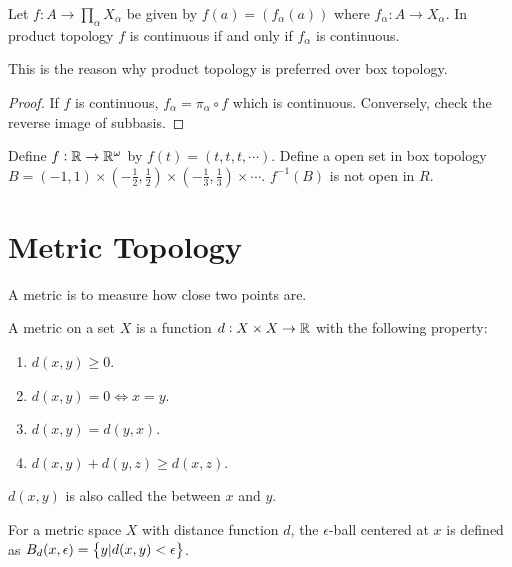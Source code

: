 \begin{theorem}
Let $\displaystyle f : A \rightarrow \prod_{\alpha} X_{\alpha}$ be given by $f(a) = \left( f_{\alpha}(a) \right)$ where $f_{\alpha} : A \rightarrow X_{\alpha}$. In product topology $f$ is continuous if and only if $f_{\alpha}$ is continuous.

This is the reason why product topology is preferred over box topology.
\end{theorem}
\begin{proof}
    If $f$ is continuous, $f_\alpha = \pi_\alpha \circ f$ which is continuous. Conversely, check the reverse image of subbasis.
\end{proof}

\begin{example}
    Define $f: \mathbb{R} \rightarrow \mathbb{R}^{\omega}$ by $f(t) = (t,t,t, \cdots)$. Define a open set in box topology $B = (-1, 1) \times (- \frac{1}{2}, \frac{1}{2}) \times  (- \frac{1}{3}, \frac{1}{3}) \times \cdots$. $f^{-1}(B)$ is not open in $R$.
\end{example}



\section{Metric Topology}

A metric is to measure how close two points are.

\begin{definition}
    A metric on a set $X$ is a function $d: X \times X \rightarrow \mathbb{R}$ with the following property:
    \begin{enumerate}
        \item $d(x,y) \geq 0$.
        \item $d(x,y) = 0 \Leftrightarrow x = y$.
        \item $d(x,y) = d(y,x)$.
        \item $d(x,y) + d(y,z) \geq d(x,z)$.
    \end{enumerate}
    
    $d(x,y)$ is also called the  between $x$ and $y$.
\end{definition}

\begin{definition}
    For a metric space $X$ with distance function $d$, the $\epsilon$-ball centered at $x$ is defined as $B_d(x, \epsilon) = \set{y | d(x,y) < \epsilon}$.
\end{definition}

